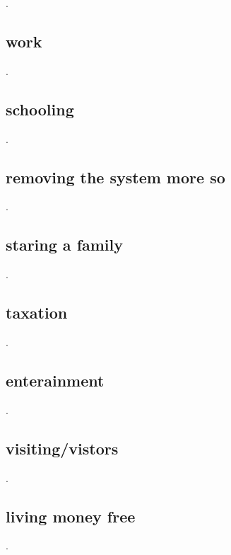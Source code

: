 \documentclass[a4paper,12pt,titlepage]{article}
\begin{document}
.
\newpage
\begin{centering}
	\section{work}
\end{centering}
.
\newpage
\begin{centering}
	\section{schooling}
\end{centering}
.
\newpage
\begin{centering}
	\section{removing the system more so}
\end{centering}
.
\newpage
\begin{centering}
	\section{staring a family}
\end{centering}
.
\newpage
\begin{centering}
	\section{taxation}
\end{centering}
.
\newpage

\begin{centering}
	\section{enterainment}
\end{centering}
.

\newpage
\begin{centering}
	\section{visiting/vistors}
\end{centering}
.
\newpage

\begin{centering}
	\section{living money free}
\end{centering}
.
\newpage
\end{document}
